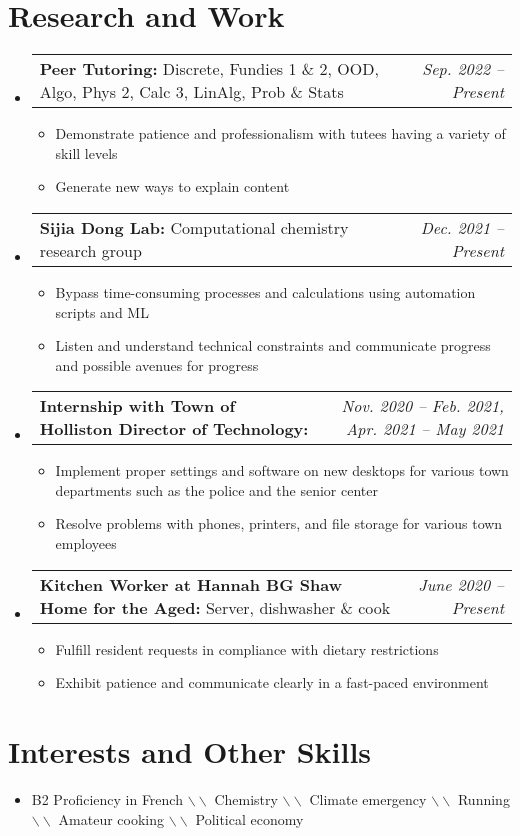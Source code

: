 \documentclass[letterpaper,11pt]{article}
\makeatletter
\newcommand{\resumeBullet}[1]{
  \item\small{
    #1 \vspace{-2pt}
  }
}
\newcommand{\resumeSubheadingThin}[3]{
  \vspace{-1pt}\item
    \begin{tabular*}{0.97\textwidth}[t]{l@{\extracolsep{\fill}}r}
      \small\textbf{#1:} #3 & \small\textit{#2} 
    \end{tabular*}\vspace{-5pt}
}
\newcommand{\summarysep}{ \textcolor{black!50}{$ \backslash \backslash $ }}
\newcommand{\resumeSubHeadingListStart}{\begin{itemize}[leftmargin=*]}
\newcommand{\resumeSubHeadingListEnd}{\end{itemize}}
\newcommand{\resumeItemListStart}{\begin{itemize}}
\newcommand{\resumeItemListEnd}{\end{itemize}\vspace{-5pt}}
\makeatother
\begin{document}
  \section{Research and Work}
  \resumeSubHeadingListStart
  \resumeSubheadingThin{Peer Tutoring}{Sep. 2022 -- Present}{Discrete, Fundies 1 \& 2, OOD, Algo, Phys 2, Calc 3, LinAlg, Prob \& Stats}
  \resumeItemListStart
    \resumeBullet{Demonstrate patience and professionalism with tutees having a variety of skill levels}
    \resumeBullet{Generate new ways to explain content}
  \resumeItemListEnd
  \resumeSubheadingThin{Sijia Dong Lab}{Dec. 2021 -- Present}{Computational chemistry research group}
  \resumeItemListStart
    \resumeBullet{Bypass time-consuming processes and calculations using automation scripts and ML}
    \resumeBullet{Listen and understand technical constraints and communicate progress and possible avenues for progress}
  \resumeItemListEnd
  \resumeSubheadingThin{Internship with Town of Holliston Director of Technology}{Nov. 2020 -- Feb. 2021, Apr. 2021 -- May 2021}{}
  \resumeItemListStart
    \resumeBullet{Implement proper settings and software on new desktops for various town departments such as the police and the senior center}
    \resumeBullet{Resolve problems with phones, printers, and file storage for various town employees}
  \resumeItemListEnd
  \resumeSubheadingThin{Kitchen Worker at Hannah BG Shaw Home for the Aged}{June 2020 -- Present}{Server, dishwasher \& cook} \resumeItemListStart
  \resumeBullet{Fulfill resident requests in compliance with dietary restrictions}
  \resumeBullet{Exhibit patience and communicate clearly in a fast-paced environment}
  \resumeItemListEnd \resumeSubHeadingListEnd

  \section{Interests and Other Skills} 
  \resumeSubHeadingListStart
    \item\small{B2 Proficiency in French \summarysep
    Chemistry \summarysep Climate emergency \summarysep Running \summarysep Amateur cooking  \summarysep Political economy }
    \resumeSubHeadingListEnd


\end{document}
